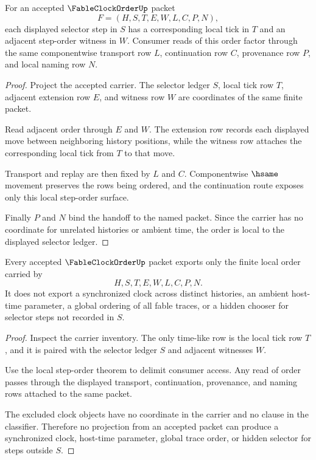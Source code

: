 \begin{theorem}
\label{thm:fable-clock-order-local-step-order}
For an accepted $\FableClockOrderUp$ packet
$$
F=(H,S,T,E,W,L,C,P,N),
$$
each displayed selector step in $S$ has a corresponding local tick in $T$ and an adjacent step-order witness in $W$. Consumer reads of this order factor through the same componentwise transport row $L$, continuation row $C$, provenance row $P$, and local naming row $N$.
\end{theorem}
\begin{proof}
Project the accepted carrier. The selector ledger $S$, local tick row $T$, adjacent extension row $E$, and witness row $W$ are coordinates of the same finite packet.

Read adjacent order through $E$ and $W$. The extension row records each displayed move between neighboring history positions, while the witness row attaches the corresponding local tick from $T$ to that move.

Transport and replay are then fixed by $L$ and $C$. Componentwise $\hsame$ movement preserves the rows being ordered, and the continuation route exposes only this local step-order surface.

Finally $P$ and $N$ bind the handoff to the named packet. Since the carrier has no coordinate for unrelated histories or ambient time, the order is local to the displayed selector ledger.
\end{proof}

\begin{theorem}
\label{thm:fable-clock-order-no-global-clock}
Every accepted $\FableClockOrderUp$ packet exports only the finite local order carried by
$$
H,S,T,E,W,L,C,P,N.
$$
It does not export a synchronized clock across distinct histories, an ambient host-time parameter, a global ordering of all fable traces, or a hidden chooser for selector steps not recorded in $S$.
\end{theorem}
\begin{proof}
Inspect the carrier inventory. The only time-like row is the local tick row $T$, and it is paired with the selector ledger $S$ and adjacent witnesses $W$.

Use the local step-order theorem to delimit consumer access. Any read of order passes through the displayed transport, continuation, provenance, and naming rows attached to the same packet.

The excluded clock objects have no coordinate in the carrier and no clause in the classifier. Therefore no projection from an accepted packet can produce a synchronized clock, host-time parameter, global trace order, or hidden selector for steps outside $S$.
\end{proof}

